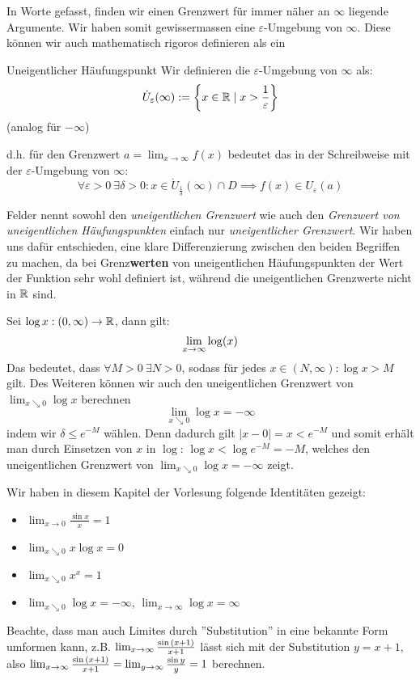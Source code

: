 In Worte gefasst, finden wir einen Grenzwert für immer näher an $\infty$ liegende Argumente. Wir haben somit gewissermassen eine $\varepsilon$-Umgebung von $\infty$. Diese können wir auch mathematisch rigoros definieren als ein

\begin{definition}{Uneigentlicher Häufungspunkt}{}
Wir definieren die $\varepsilon$-Umgebung von $\infty$ als:
$$\dot{U}_\varepsilon(\infty) := \left\{x \in \mathbb{R} \mid x > \frac{1}{\varepsilon}\right\}$$
(analog für $-\infty$)
\end{definition}
d.h. für den Grenzwert $a = \lim_{x \to \infty}f(x)$ bedeutet das in der Schreibweise mit der $\varepsilon$-Umgebung von $\infty$:
$$\forall \varepsilon>0 \ \exists \delta>0: x \in \dot{U}_{\frac{1}{\delta}}(\infty) \cap D \implies f(x) \in U_\varepsilon(a)$$

\begin{remark}
Felder nennt sowohl den \textit{uneigentlichen Grenzwert} wie auch den \textit{Grenzwert von uneigentlichen Häufungspunkten} einfach nur \textit{uneigentlicher Grenzwert}. Wir haben uns dafür entschieden, eine klare Differenzierung zwischen den beiden Begriffen zu machen, da bei Grenz\textbf{werten} von uneigentlichen Häufungspunkten der Wert der Funktion sehr wohl definiert ist, während die uneigentlichen Grenzwerte nicht in $\mathbb{R}$ sind.
\end{remark} 

\begin{example} Sei $\log{x}: (0, \infty) \to \mathbb{R}$, dann gilt:
$$ \lim_{x \to \infty}{\log(x)}$$
Das bedeutet, dass $\forall M >0 \ \exists N>0$, sodass für jedes $x \in (N, \infty): \log x > M$ gilt. Des Weiteren können wir auch den uneigentlichen Grenzwert von $\lim_{x \searrow 0} \log{x}$ berechnen
$$\lim_{x \searrow 0} \log x = - \infty$$
indem wir $\delta \leq e^{-M}$ wählen. Denn dadurch gilt $|x - 0| = x < e^{-M}$ und somit erhält man durch Einsetzen von $x$ in $\log$: $\log x < \log e^{-M} = -M $, welches den uneigentlichen Grenzwert von $\lim_{x \searrow 0} \log x = -\infty$ zeigt.
\end{example}

\begin{tipp}{}{}
Wir haben in diesem Kapitel der Vorlesung folgende Identitäten gezeigt:
\begin{itemize}
    \item $\lim_{x \to 0}{\frac{\sin{x}}{x}} = 1$
    \item $\lim_{x \searrow 0} x \log x = 0$
    \item $\lim_{x \searrow 0} x^x = 1$
    \item $\lim_{x \searrow 0} \log x = -\infty$, $\lim_{x \to \infty} \log x = \infty$
\end{itemize}
Beachte, dass man auch Limites durch ''Substitution'' in eine bekannte Form umformen kann, z.B. $\lim_{x \to \infty}{\frac{\sin{(x + 1)}}{x+1}}$ lässt sich mit der Substitution $y = x + 1$, also $\lim_{x \to \infty}{\frac{\sin{(x + 1)}}{x+1}} = \lim_{y \to \infty}{\frac{\sin y}{y}} = 1$ berechnen. %
\end{tipp}


